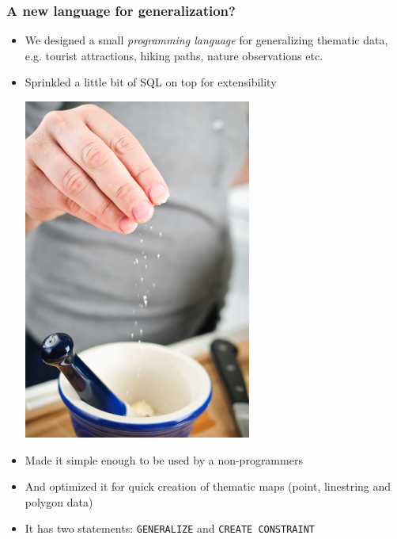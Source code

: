 \documentclass{beamer}
\begin{document}
\frame
{
  \frametitle{A new language for generalization?}
  \begin{itemize}[<+->]
  \item We designed a small \emph{programming language} for generalizing thematic data, e.g. tourist attractions, hiking paths, nature observations etc.
  \item Sprinkled a little bit of SQL on top for extensibility
  \begin{center}
  \includegraphics[scale=0.18]{figs/sprinkle.jpg}
  \end{center}
  \item Made it simple enough to be used by a non-programmers
  \item And optimized it for quick creation of thematic maps (point, linestring and polygon data)
  \item It has two statements: \texttt{GENERALIZE} and \texttt{CREATE CONSTRAINT}
  \end{itemize}
}
\end{document}

